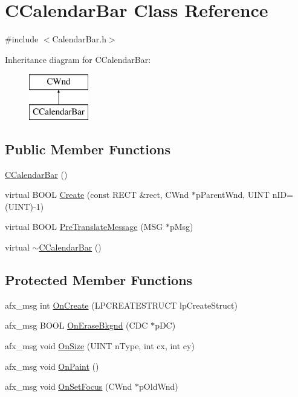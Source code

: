 \hypertarget{class_c_calendar_bar}{}\section{C\+Calendar\+Bar Class Reference}
\label{class_c_calendar_bar}


{\ttfamily \#include $<$Calendar\+Bar.\+h$>$}

Inheritance diagram for C\+Calendar\+Bar\+:\begin{figure}[H]
\begin{center}
\leavevmode
\includegraphics[height=2.000000cm]{class_c_calendar_bar}
\end{center}
\end{figure}
\subsection*{Public Member Functions}
\begin{DoxyCompactItemize}
\item 
\hyperlink{class_c_calendar_bar_a80e9382c554edae25ed17648ec1e5f54}{C\+Calendar\+Bar} ()
\item 
virtual B\+O\+O\+L \hyperlink{class_c_calendar_bar_a63e33b61f13ffff5f02f89d475690536}{Create} (const R\+E\+C\+T \&rect, C\+Wnd $\ast$p\+Parent\+Wnd, U\+I\+N\+T n\+I\+D=(U\+I\+N\+T)-\/1)
\item 
virtual B\+O\+O\+L \hyperlink{class_c_calendar_bar_ab2240585a89fd3a97172ebcd90157a1b}{Pre\+Translate\+Message} (M\+S\+G $\ast$p\+Msg)
\item 
virtual \hyperlink{class_c_calendar_bar_a3ffd6e18195fbd73c8042e346da1f8e3}{$\sim$\+C\+Calendar\+Bar} ()
\end{DoxyCompactItemize}
\subsection*{Protected Member Functions}
\begin{DoxyCompactItemize}
\item 
afx\+\_\+msg int \hyperlink{class_c_calendar_bar_a433926b607504c33c9397d8ea1e7e128}{On\+Create} (L\+P\+C\+R\+E\+A\+T\+E\+S\+T\+R\+U\+C\+T lp\+Create\+Struct)
\item 
afx\+\_\+msg B\+O\+O\+L \hyperlink{class_c_calendar_bar_aa52db6de67ea1671951dd2e08ac8cbd2}{On\+Erase\+Bkgnd} (C\+D\+C $\ast$p\+D\+C)
\item 
afx\+\_\+msg void \hyperlink{class_c_calendar_bar_a06e736ce379fab94c8abe150eba4c4d7}{On\+Size} (U\+I\+N\+T n\+Type, int cx, int cy)
\item 
afx\+\_\+msg void \hyperlink{class_c_calendar_bar_a6b27805b7d959d222166dc5e4e09904b}{On\+Paint} ()
\item 
afx\+\_\+msg void \hyperlink{class_c_calendar_bar_a571ed2666caa05790866b7643a0f10ec}{On\+Set\+Focus} (C\+Wnd $\ast$p\+Old\+Wnd)
\end{DoxyCompactItemize}
